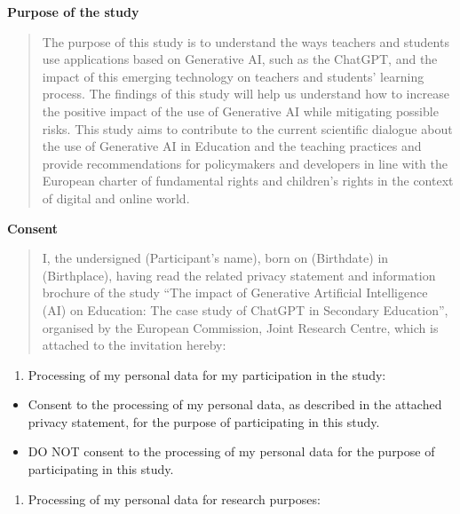 \documentclass[
  11pt,
]{article}
\providecommand{\tightlist}{%
  \setlength{\itemsep}{0pt}\setlength{\parskip}{0pt}}
\begin{document}
\textbf{Purpose of the study}

\begin{quote}
The purpose of this study is to understand the ways teachers and students use applications based on Generative AI, such as the ChatGPT, and the impact of this emerging technology on teachers and students' learning process. The findings of this study will help us understand how to increase the positive impact of the use of Generative AI while mitigating possible risks. This study aims to contribute to the current scientific dialogue about the use of Generative AI in Education and the teaching practices and provide recommendations for policymakers and developers in line with the European charter of fundamental rights and children's rights in the context of digital and online world.
\end{quote}

\textbf{Consent}

\begin{quote}
I, the undersigned (Participant's name), born on (Birthdate) in (Birthplace), having read the related privacy statement and information brochure of the study ``The impact of Generative Artificial Intelligence (AI) on Education: The case study of ChatGPT in Secondary Education'', organised by the European Commission, Joint Research Centre, which is attached to the invitation hereby:
\end{quote}

\begin{enumerate}
\def\labelenumi{(\arabic{enumi})}
\tightlist
\item
  Processing of my personal data for my participation in the study:
\end{enumerate}

\begin{itemize}
\tightlist
\item[$\square$]
  Consent to the processing of my personal data, as described in the attached privacy statement, for the purpose of participating in this study.
\item[$\square$]
  DO NOT consent to the processing of my personal data for the purpose of participating in this study.
\end{itemize}

\begin{enumerate}
\def\labelenumi{(\arabic{enumi})}
\setcounter{enumi}{1}
\tightlist
\item
  Processing of my personal data for research purposes:
\end{enumerate}
\end{document}
